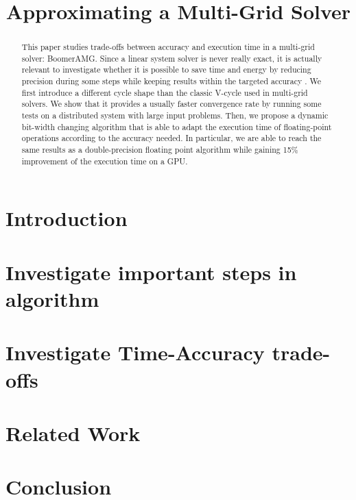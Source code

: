 \documentclass[10pt,conference]{IEEEtran}
\title{Approximating a Multi-Grid Solver}
\author{

    \IEEEauthorblockN{Valentin Le F\`{e}vre}
    \IEEEauthorblockA{
        \'{E}cole Normale Supérieure de Lyon\\
        valentin.le-fevre@ens-lyon.fr}
    \and
    \IEEEauthorblockN{Leonardo Bautista-Gomez}
    \IEEEauthorblockA{
        Barcelona Supercomputing Center (BSC)\\
        leonardo.bautista@bsc.es}
    \and
    \IEEEauthorblockN{Marc Casas}
    \IEEEauthorblockA{
        Barcelona Supercomputing Center (BSC)\\
        marc.casas@bsc.es}
}
\begin{document}
\maketitle
\begin{abstract}
    This paper studies trade-offs between accuracy and execution time in a
    multi-grid solver: BoomerAMG. Since a linear system solver is never really
    exact, it is actually relevant to investigate whether it is possible to
    save time and energy by reducing precision during some steps while keeping
    results within the targeted accuracy . We first introduce a different cycle
    shape than the classic V-cycle used in multi-grid solvers. We show that it
    provides a usually faster convergence rate by running some tests on a
    distributed system with large input problems. Then, we propose a dynamic
    bit-width changing algorithm that is able to adapt the execution time of
    floating-point operations according to the accuracy needed. In particular,
    we are able to reach the same results as a double-precision floating point
    algorithm while gaining 15\% improvement of the execution time on a GPU.
\end{abstract}

\section{Introduction}
\label{sec:intro}



%
%

\section{Investigate important steps in algorithm}
\label{sec:algo}





\section{Investigate Time-Accuracy trade-offs}
\label{sec:accuracy}







\section{Related Work}
\label{sec:related}



\section{Conclusion}
\label{sec:conclusions}





\end{document}
